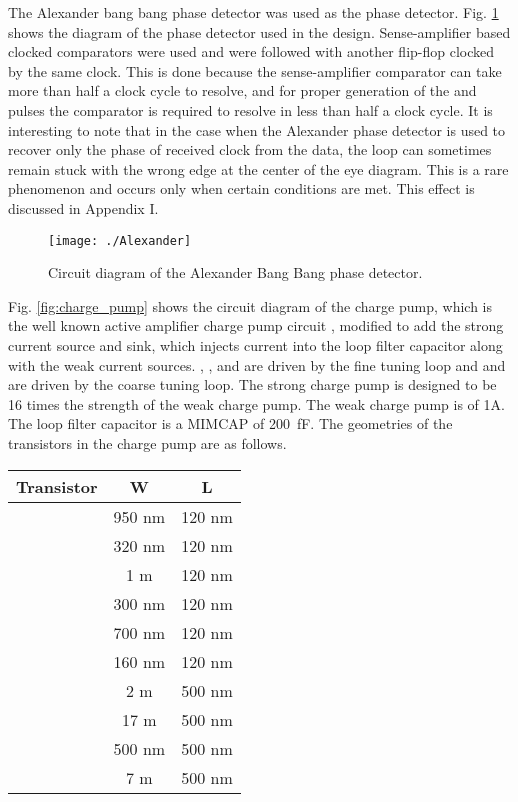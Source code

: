 \documentclass[journal,twoside,letterpaper]{IEEEtran}
\begin{document}
The Alexander bang bang phase detector was used as the phase detector. 
Fig. \ref{fig:alex} shows the diagram of the phase detector
used in the design.
Sense-amplifier based clocked comparators \cite{Nikolic-jssc-2000}
were used and were followed with another flip-flop 
clocked by the same clock.
This is done because the sense-amplifier comparator can take
more than half a clock cycle to resolve,
and for proper generation of the  and  pulses
the comparator is required to resolve in less than half a clock cycle.
It is interesting to note that in the case
when the Alexander phase detector is used
to recover only the phase of received clock from the data,
the loop can sometimes remain stuck
with the wrong edge at the center of the eye diagram.
This is a rare phenomenon and occurs only
when certain conditions are met.
This effect is discussed in Appendix I.
\begin{figure}[h!]
\centering
\texttt{[image: ./Alexander]}
\caption{Circuit diagram of the Alexander Bang Bang phase detector.}
\label{fig:alex}
\end{figure}

Fig. \ref{fig:charge_pump} shows the circuit 
diagram of the charge pump,
which is the well known active amplifier charge pump circuit 
\cite{active_CP}, modified to add the strong current source and sink, which
injects current into the loop filter capacitor along with
the weak current sources.
, ,  and 
are driven by the fine tuning loop
and  and  are driven
by the coarse tuning loop.
The strong charge pump is designed to be
16 times the strength of the weak charge pump.
The weak charge pump is of 1A.
The loop filter capacitor is a MIMCAP of \mbox{200 fF}. 
The geometries of the transistors in the
charge pump are as follows.
\begin{center}
\begin{tabular}{|c|c|c|}
\hline
Transistor & W & L \\ \hline
 & 950 nm & 120 nm \\ \hline
 & 320 nm & 120 nm \\ \hline
 & 1 m & 120 nm \\ \hline 
 & 300 nm & 120 nm \\ \hline
 & 700 nm & 120 nm \\ \hline
 & 160 nm & 120 nm \\ \hline
 & 2 m & 500 nm \\ \hline
 & 17 m & 500 nm \\ \hline
 & 500 nm & 500 nm \\ \hline
 & 7 m & 500 nm \\ \hline 
\end{tabular}
\end{center}
\end{document}
